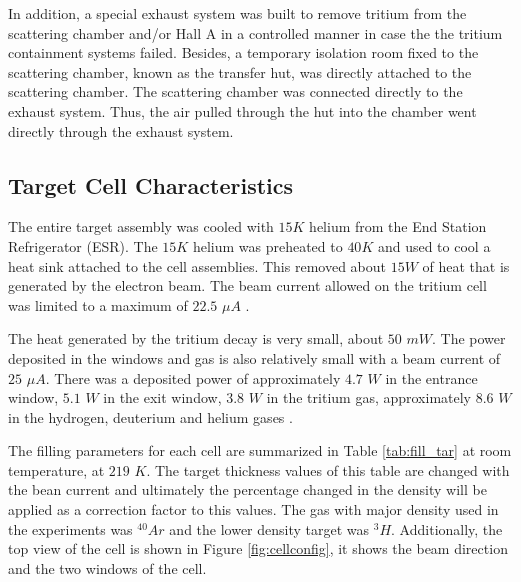\documentclass[final,5p,times,twocolumn]{elsarticle}
\begin{document}
In addition, a special exhaust system was built to remove tritium from the scattering chamber and/or Hall A in a controlled manner in case the the tritium containment systems failed. Besides, a temporary isolation room fixed to the scattering chamber, known as the transfer hut, was directly attached to the scattering chamber. The scattering chamber was connected directly to the exhaust system. Thus, the air pulled through the hut into the chamber went directly through the exhaust system.  

\subsection{Target Cell Characteristics}

The entire target assembly was cooled with $15K$ helium from the End Station Refrigerator (ESR). The $15K$ helium was preheated to $40K$ and used to cool a heat sink attached to the cell assemblies. This removed about $15W$ of heat that is generated by the electron beam. The beam current allowed on the tritium cell was limited to a maximum of $22.5$ $\mu A$ \cite{engreport}.

The heat generated by the tritium decay is very small, about $50$ $mW$. The power deposited in the windows and gas is also relatively small with a beam current of $25$ $\mu A$. There was a deposited power of approximately $4.7$ $W$ in the entrance window, $5.1$ $W$ in the exit window, $3.8$ $W$ in the tritium gas, approximately $8.6$ $W$ in the hydrogen, deuterium and helium gases \cite{celldes}.
 
The filling parameters for each cell are summarized in Table \ref{tab:fill_tar} at room temperature, at $219$ $K$. The target thickness values of this table are changed with the bean current and ultimately the percentage changed in the density will be applied as a correction factor to this values. The gas with major density used in the experiments was $^{40}Ar$ and the lower density target was $^{3}H$.  Additionally, the top view of the cell is shown in Figure \ref{fig:cellconfig},  it shows the beam direction and the two windows of the cell.
\end{document}
